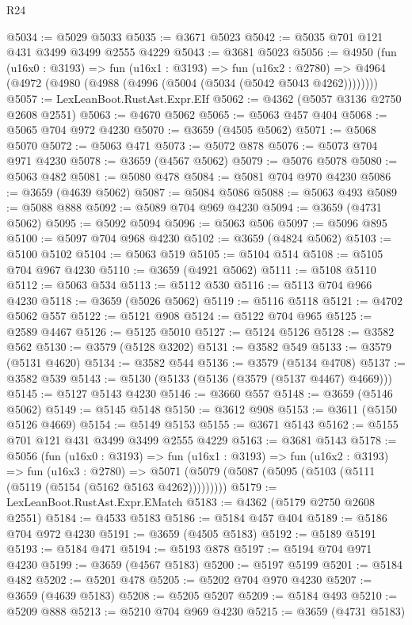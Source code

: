 \begin{lexlean}{R24}
\begin{coremodule}
@5034 := @5029 @5033
@5035 := @3671 @5023
@5042 := @5035 @701 @121 @431 @3499 @3499 @2555 @4229
@5043 := @3681 @5023
@5056 := @4950
    (fun (u16x0 : @3193) =>
    fun (u16x1 : @3193) =>
    fun (u16x2 : @2780) =>
    @4964 (@4972 (@4980 (@4988 (@4996 (@5004 (@5034 (@5042 @5043 @4262))))))))
@5057 := LexLeanBoot.RustAst.Expr.EIf
@5062 := @4362 (@5057 @3136 @2750 @2608 @2551)
@5063 := @4670 @5062
@5065 := @5063 @457 @404
@5068 := @5065 @704 @972 @4230
@5070 := @3659 (@4505 @5062)
@5071 := @5068 @5070
@5072 := @5063 @471
@5073 := @5072 @878
@5076 := @5073 @704 @971 @4230
@5078 := @3659 (@4567 @5062)
@5079 := @5076 @5078
@5080 := @5063 @482
@5081 := @5080 @478
@5084 := @5081 @704 @970 @4230
@5086 := @3659 (@4639 @5062)
@5087 := @5084 @5086
@5088 := @5063 @493
@5089 := @5088 @888
@5092 := @5089 @704 @969 @4230
@5094 := @3659 (@4731 @5062)
@5095 := @5092 @5094
@5096 := @5063 @506
@5097 := @5096 @895
@5100 := @5097 @704 @968 @4230
@5102 := @3659 (@4824 @5062)
@5103 := @5100 @5102
@5104 := @5063 @519
@5105 := @5104 @514
@5108 := @5105 @704 @967 @4230
@5110 := @3659 (@4921 @5062)
@5111 := @5108 @5110
@5112 := @5063 @534
@5113 := @5112 @530
@5116 := @5113 @704 @966 @4230
@5118 := @3659 (@5026 @5062)
@5119 := @5116 @5118
@5121 := @4702 @5062 @557
@5122 := @5121 @908
@5124 := @5122 @704 @965
@5125 := @2589 @4467
@5126 := @5125 @5010
@5127 := @5124 @5126
@5128 := @3582 @562
@5130 := @3579 (@5128 @3202)
@5131 := @3582 @549
@5133 := @3579 (@5131 @4620)
@5134 := @3582 @544
@5136 := @3579 (@5134 @4708)
@5137 := @3582 @539
@5143 := @5130 (@5133 (@5136 (@3579 (@5137 @4467) @4669)))
@5145 := @5127 @5143 @4230
@5146 := @3660 @557
@5148 := @3659 (@5146 @5062)
@5149 := @5145 @5148
@5150 := @3612 @908
@5153 := @3611 (@5150 @5126 @4669)
@5154 := @5149 @5153
@5155 := @3671 @5143
@5162 := @5155 @701 @121 @431 @3499 @3499 @2555 @4229
@5163 := @3681 @5143
@5178 := @5056
    (fun (u16x0 : @3193) =>
    fun (u16x1 : @3193) =>
    fun (u16x2 : @3193) =>
    fun (u16x3 : @2780) =>
    @5071 (@5079 (@5087 (@5095 (@5103 (@5111 (@5119 (@5154 (@5162 @5163 @4262)))))))))
@5179 := LexLeanBoot.RustAst.Expr.EMatch
@5183 := @4362 (@5179 @2750 @2608 @2551)
@5184 := @4533 @5183
@5186 := @5184 @457 @404
@5189 := @5186 @704 @972 @4230
@5191 := @3659 (@4505 @5183)
@5192 := @5189 @5191
@5193 := @5184 @471
@5194 := @5193 @878
@5197 := @5194 @704 @971 @4230
@5199 := @3659 (@4567 @5183)
@5200 := @5197 @5199
@5201 := @5184 @482
@5202 := @5201 @478
@5205 := @5202 @704 @970 @4230
@5207 := @3659 (@4639 @5183)
@5208 := @5205 @5207
@5209 := @5184 @493
@5210 := @5209 @888
@5213 := @5210 @704 @969 @4230
@5215 := @3659 (@4731 @5183)

\end{coremodule}
\end{lexlean}
